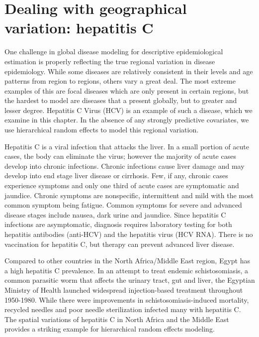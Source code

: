 \chapter{Dealing with geographical variation: hepatitis C}
\label{applications-rfx}

One challenge in global disease modeling for descriptive
epidemiological estimation is properly reflecting the true regional
variation in disease epidemiology. While some diseases are relatively
consistent in their levels and age patterns from region to regions,
others vary a great deal.  The most extreme examples of this are focal
diseases which are only present in certain regions, but the hardest to
model are diseases that a present globally, but to greater and lesser
degree.  Hepatitis C Virus (HCV) is an example of such a disease,
which we examine in this chapter.  In the absence of any strongly
predictive covariates, we use hierarchical random effects to model
this regional variation.

Hepatitis C is a viral infection that attacks the liver.  In a small
portion of acute cases, the body can eliminate the virus; however the
majority of acute cases develop into chronic infections.  Chronic
infections cause liver damage and may develop into end stage liver
disease or cirrhosis.  Few, if any, chronic cases experience symptoms
and only one third of acute cases are symptomatic and jaundice.
Chronic symptoms are nonspecific, intermittent and mild with the most
common symptom being fatigue.  Common symptoms for severe and advanced
disease stages include nausea, dark urine and jaundice.  Since
hepatitis C infections are asymptomatic, diagnosis requires laboratory
testing for both hepatitis antibodies (anti-HCV) and the hepatitis
virus (HCV RNA).  There is no vaccination for hepatitis C, but therapy
can prevent advanced liver disease. \cite{hoofnagle_hepatitis_1997,
  ghany_diagnosis_2009}

Compared to other countries in the North Africa/Middle East region,
Egypt has a high hepatitis C prevalence.  In an attempt to treat
endemic schistosomiasis, a common parasitic worm that affects the
urinary tract, gut and liver, the Egyptian Ministry of Health launched
widespread injection-based treatment throughout 1950-1980.  While
there were improvements in schistosomiasis-induced mortality, recycled
needles and poor needle sterilization infected many with hepatitis
C. \cite{frank_role_2000, mezban_hepatitis_2006,
  strickland_liver_2006} The spatial variations of hepatitis C in
North Africa and the Middle East provides a striking example for
hierarchical random effects modeling.


